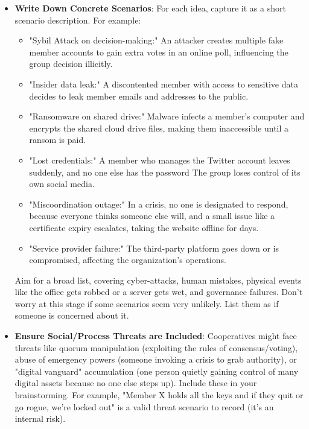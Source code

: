 \begin{itemize}
    \item \textbf{Write Down Concrete Scenarios}:
    For each idea, capture it as a short scenario description.
    For example:

    \begin{itemize}
        \item "Sybil Attack on decision-making:" An attacker creates multiple fake member
        accounts to gain extra votes in an online poll, influencing the group decision illicitly.
        \item "Insider data leak:" A discontented member with access to sensitive data decides to leak member
        emails and addresses to the public.
        \item "Ransomware on shared drive:" Malware infects a member's computer and encrypts the shared cloud
        drive files, making them inaccessible until a ransom is paid.
        \item "Lost credentials:" A member who manages the Twitter account leaves suddenly, and no one else has
        the password The group loses control of its own social media.
        \item "Miscoordination outage:" In a crisis, no one is designated to respond, because everyone thinks
        someone else will, and a small issue like a certificate expiry escalates, taking the website offline
        for days.
        \item "Service provider failure:" The third-party platform goes
        down or is compromised, affecting the organization's operations.
    \end{itemize}

    Aim for a broad list, covering cyber-attacks, human mistakes, physical events
    like the office gets robbed or a server gets wet, and governance failures. Don't
    worry at this stage if some scenarios seem very unlikely. List them as if someone
    is concerned about it.

    \item \textbf{Ensure Social/Process Threats are Included}:
    Cooperatives might face threats like quorum manipulation (exploiting the rules
    of consensus/voting), abuse of emergency powers (someone invoking a crisis to
    grab authority), or "digital vanguard" accumulation (one person quietly gaining
    control of many digital assets because no one else steps up). Include these in
    your brainstorming. For example, "Member X holds all the keys and if they quit
    or go rogue, we're locked out" is a valid threat scenario to record (it's an
    internal risk).

\end{itemize}

